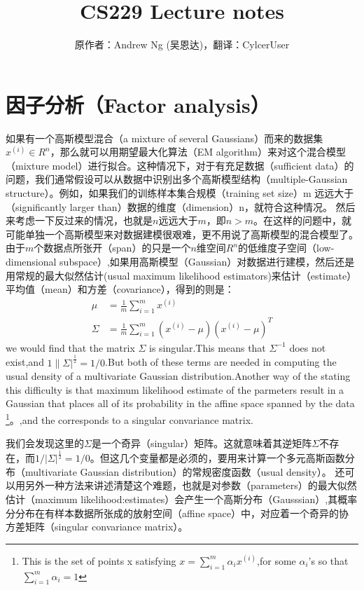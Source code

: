 \documentclass[14pt,a4paper]{article}
\title{CS229 Lecture notes}
\author{原作者：Andrew Ng (吴恩达)，翻译：CylcerUser}
\date{}
\begin{document}
\maketitle

\section{因子分析（Factor analysis）}  

\begin{spacing}{1.5}

\quad \quad 如果有一个高斯模型混合（a mixture of several Gaussians）而来的数据集$x^{(i)}\in R^{n}$，那么就可以用期望最大化算法（EM algorithm）来对这个混合模型（mixture model）进行拟合。这种情况下，对于有充足数据（sufficient data）的问题，我们通常假设可以从数据中识别出多个高斯模型结构（multiple-Gaussian structure）。例如，如果我们的训练样本集合规模（training set size）m 远远大于（significantly larger than）数据的维度（dimension）n，就符合这种情况。
然后来考虑一下反过来的情况，也就是$n$远远大于$m$，即$n>m$。在这样的问题中，就可能单独一个高斯模型来对数据建模很艰难，更不用说了高斯模型的混合模型了。由于$m$个数据点所张开（span）的只是一个$n$维空间$R^n$的低维度子空间（low-dimensional subspace）,如果用高斯模型（Gaussian）对数据进行建模，然后还是用常规的最大似然估计(usual maximum likelihood estimators)来估计（estimate）平均值（mean）和方差（covariance），得到的则是：
$$
\begin{aligned}
\mu&=\frac{1}{m}\sum_{i=1}^{m}x^{(i)}  \\
\Sigma&=\frac{1}{m}\sum_{i=1}^{m}(x^{(i)}-\mu)(x^{(i)}-\mu)^{T}
\end{aligned}
$$
we would find that the matrix $\Sigma$ is singular.This means that $\Sigma^{-1}$ does not exist,and $1\|\Sigma|^{\frac{1}{2}}=1/0$.But both of these terms are needed in computing the usual density of a multivariate Gaussian distribution.Another way of the stating this difficulty is that maximum likelihood estimate of the parmeters result in a Gaussian that places all of its probability in the affine space spanned by the data \footnote{This is the set of points x satisfying $x=\sum_{i=1}^{m}\alpha_{i}x^{(i)}$,for some $\alpha_{i}$'s so that $\sum_{i=1}^{m}\alpha_{i}=1$}。,and the corresponds to a singular convariance matrix.

我们会发现这里的$\Sigma$是一个奇异（singular）矩阵。这就意味着其逆矩阵$\Sigma$不存在，而$1/|\Sigma|^{\frac{1}{2}}=1/0$。但这几个变量都是必须的，要用来计算一个多元高斯函数分布（multivariate Gaussian distribution）的常规密度函数（usual density）。 还可以用另外一种方法来讲述清楚这个难题，也就是对参数（parameters）的最大似然估计（maximum likelihood:estimates）会产生一个高斯分布（Gausssian）,其概率分分布在有样本数据所张成的放射空间（affine space）中，对应着一个奇异的协方差矩阵（singular convariance matrix）。


\end{spacing}
\end{document}
